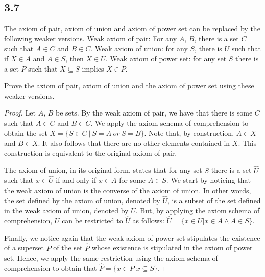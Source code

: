\subsection*{3.7} The axiom of pair, axiom of union and axiom of power set can be replaced by the following weaker versions. Weak axiom of pair: For any $A$, $B$, there is a set $C$ such that $A \in C$ and $B \in C$. Weak axiom of union: for any $S$, there is $U$ such that if $X \in A$ and $A \in S$, then $X \in U$. Weak axiom of power set: for any set $S$ there is a set $P$ such that $X \subseteq S$ implies $X \in P$.

Prove the axiom of pair, axiom of union and the axiom of power set using these weaker versions.

\begin{proof}

Let $A$, $B$ be sets. By the weak axiom of pair, we have that there is some $C$ such that $A \in C$ and $B \in C$. We apply the axiom schema of comprehension to obtain the set $X = \{S \in C~|~S = A~or~S=B\}$. Note that, by construction, $A \in X$ and $B \in X$. It also follows that there are no other elements contained in $X$. This construction is equivalent to the original axiom of pair.




The axiom of union, in its original form, states that for any set $S$ there is a set $\hat{U}$ such that $x \in \hat{U}$ if and only if $x \in A$ for some $A \in S$. We start by noticing that the weak axiom of union is the converse of the axiom of union. In other words, the set defined by the axiom of union, denoted by $\hat{U}$, is a subset of the set defined in the weak axiom of union, denoted by $U$. But, by applying the axiom schema of comprehension, $U$ can be restricted to $\hat{U}$ as follows: $\hat{U} = \{x \in U | x \in A \land A \in S\}$.


Finally, we notice again that the weak axiom of power set stipulates the existence of a superset $P$ of the set $\hat{P}$ whose existence is stipulated in the axiom of power set. Hence, we apply the same restriction using the axiom schema of comprehension to obtain that $\hat{P} = \{x \in P|x \subseteq S\}$.
\end{proof}



